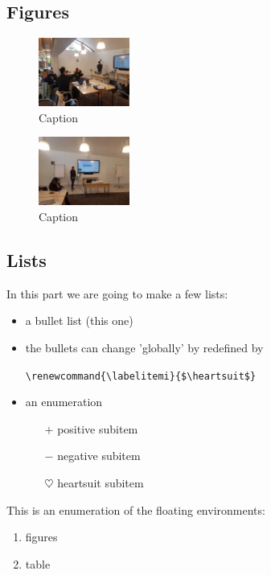 \documentclass[parskip=half]{scrartcl}
\begin{document}
\subsection{Figures}

\begin{figure}
    \centering
    \includegraphics[width=3cm]{photo1.jpg}
    \caption{Caption}
    \label{fig:picture1}
\end{figure}

\begin{figure}
    \centering
    \includegraphics[width=3cm]{photo2.jpg}
    \caption{Caption}
    \label{fig:picture2}
\end{figure}

\subsection{Lists}

In this part we are going to make a few lists:
\begin{itemize}
    \item a bullet list (this one)
    \item the bullets can change 'globally' by redefined by
    
    \verb|\renewcommand{\labelitemi}{$\heartsuit$}|
    \item an enumeration
    \begin{itemize}
        \item[$+$] positive subitem
        \item[$-$] negative subitem
        \item[$\heartsuit$] heartsuit subitem
    \end{itemize}
\end{itemize}

This is an enumeration of the floating environments:
\begin{enumerate}
    \item figures
    \item table
\end{enumerate}
\end{document}
